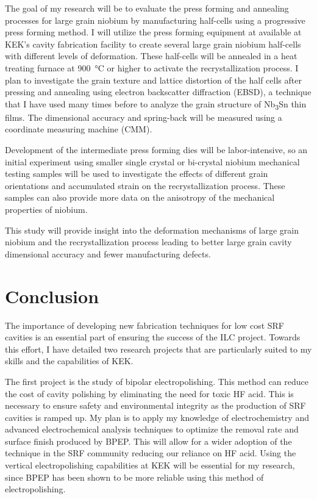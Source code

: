 \documentclass[]{revtex4-2}
\begin{document}
    The goal of my research will be to evaluate the press forming and annealing processes for large grain niobium by manufacturing half-cells using a progressive press forming method. I will utilize the press forming equipment at available at KEK's cavity fabrication facility to create several large grain niobium half-cells with different levels of deformation. These half-cells will be annealed in a heat treating furnace at \qty{900}{\degreeCelsius} or higher to activate the recrystallization process. I plan to investigate the grain texture and lattice distortion of the half cells after pressing and annealing using electron backscatter diffraction (EBSD), a technique that I have used many times before to analyze the grain structure of Nb\textsubscript{3}Sn thin films. The dimensional accuracy and spring-back will be measured using a coordinate measuring machine (CMM). 
    
    Development of the intermediate press forming dies will be labor-intensive, so an initial experiment using smaller single crystal or bi-crystal niobium mechanical testing samples will be used to investigate the effects of different grain orientations and accumulated strain on the recrystallization process. These samples can also provide more data on the anisotropy of the mechanical properties of niobium.
    
    This study will provide insight into the deformation mechanisms of large grain niobium and the recrystallization process leading to better large grain cavity dimensional accuracy and fewer manufacturing defects.



\section{Conclusion}

    The importance of developing new fabrication techniques for low cost SRF cavities is an essential part of ensuring the success of the ILC project. Towards this effort, I have detailed two research projects that are particularly suited to my skills and the capabilities of KEK. 
    
    The first project is the study of bipolar electropolishing. This method can reduce the cost of cavity polishing by eliminating the need for toxic HF acid. This is necessary to ensure safety and environmental integrity as the production of SRF cavities is ramped up. My plan is to apply my knowledge of electrochemistry and advanced electrochemical analysis techniques to optimize the removal rate and surface finish produced by BPEP. This will allow for a wider adoption of the technique in the SRF community reducing our reliance on HF acid. Using the vertical electropolishing capabilities at KEK will be essential for my research, since BPEP has been shown to be more reliable using this method of electropolishing.
\end{document}
